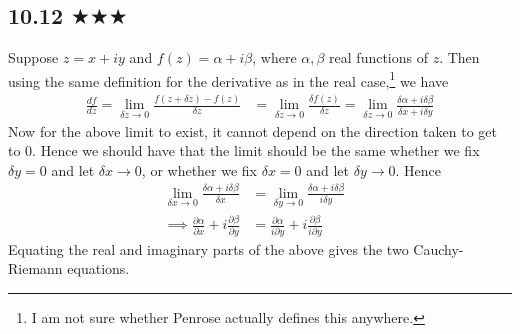 \subsection{10.12 $\bigstar\bigstar\bigstar$}
Suppose $z=x+iy$ and $f(z)=\alpha+i\beta$, where $\alpha,\beta$ real functions of $z$. Then using the same definition for the derivative as in the real case,\footnote{I am not sure whether Penrose actually defines this anywhere.} we have
\begin{align*}
\frac{d f}{ d z}=\lim_{\delta z\to 0}\frac{f(z+\delta z)-f(z)}{\delta z}&=\lim_{\delta z\to 0}\frac{\delta f(z)}{\delta z}=\lim_{\delta z\to 0}\frac{\delta \alpha+i\delta \beta}{\delta x+i\delta y}
\end{align*}
Now for the above limit to exist, it cannot depend on the direction taken to get to 0. Hence we should have that the limit should be the same whether we fix $\delta y=0$ and let $\delta x\to 0$, or whether we fix $\delta x=0$ and let $\delta y\to 0$. Hence
\begin{align*}
\lim_{\delta x \to 0}\frac{\delta \alpha+i\delta \beta}{\delta x}&=\lim_{\delta y \to 0}\frac{\delta \alpha+i\delta \beta}{i\delta y}\\
\implies \frac{\partial \alpha }{\partial x}+i\frac{\partial\beta}{\partial y} &=\frac{\partial \alpha }{i\partial y}+i\frac{\partial\beta}{i \partial y} &
\end{align*}
Equating the real and imaginary parts of the above gives the two Cauchy-Riemann equations.













